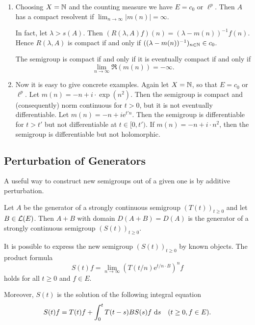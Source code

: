 \begin{example}
\begin{enumerate}[\upshape (i), wide, labelindent=.5em]
\item \label{ex:a2-1.28-4}
Choosing $X = \mathbb{N}$ and the counting measure we have $E = c_{0}$ or $\ell^{p}$.
Then $A$ has a compact resolvent if 
$\lim_{n \to \infty} |m(n)| = \infty$.  

In fact, let $\lambda > s(A)$.
Then $(R(\lambda,A)f)(n) = (\lambda-m(n))^{-1}f(n)$.
Hence $R(\lambda,A)$ is compact if and only if $((\lambda-m(n))^{-1})_{n \in \mathbb{N}} \in c_{0}$. 

The semigroup is compact if and only if it is eventually compact if and only if 
\[
\lim_{n \to \infty} \Re(m(n)) = -\infty.
\]

\item \label{ex:a2-1.28-5}
Now it is easy to give concrete examples.
Again let $X = \mathbb{N}$, so that $E = c_{0}$ or $\ell^{p}$.
Let $m(n) = -n + i \cdot \exp(n^2)$.
Then the semigroup is compact and (consequently) norm continuous for $t > 0$, but it is not eventually differentiable.
Let $m(n) = -n + i\mathrm{e}^{t'n}$.
Then the semigroup is differentiable for $t > t'$ but not differentiable at $t \in [0,t')$.
If $m(n) = -n + i \cdot n^2$, then the semigroup is differentiable but not holomorphic.
\end{enumerate}
\end{example}	

\subsection{Perturbation of Generators} \label{subsec:a2-1.se8}
A useful way to construct new semigroups out of a given one is by additive perturbation.%
\begin{theorem}\label{thm:a2-1.29}
Let $A$ be the generator of a strongly continuous semigroup $(T(t))_{t \geq 0}$ and let $B \in \mathcal{L}(E)$.
Then $A + B$ with domain $D(A+B) = D(A)$ is the generator of a strongly continuous semigroup $(S(t))_{t \geq 0}$.
\end{theorem}

It is possible to express the new semigroup $(S(t))_{t \geq 0}$ by known objects.
The product formula
\begin{equation}\label{eq:a2-1.8}
    S(t)f = \lim_{n \to \infty} (T(t/n)\mathrm{e}^{t/n \cdot B})^{n}f
\end{equation}
holds for all $t \geq 0$ and $f \in E$.

Moreover, $S(t)$ is the solution of the following integral equation
\begin{equation}\label{eq:a2-1.9}
    S(t)f = T(t)f + \int_{0}^{t} T(t-s)BS(s)f\, \mathop{}\!\mathrm{d}{s} \quad (t \geq 0, f \in E).
\end{equation}

